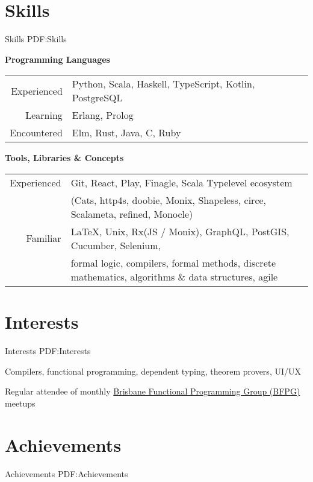 \documentclass[a4paper,10pt,oneside]{article}
\begin{document}
\begin{body}

\section
{Skills}
{Skills}
{PDF:Skills}

\textbf{Programming Languages}
\par
\begin{tabular}{rl}
\par Experienced & Python, Scala, Haskell, TypeScript, Kotlin, PostgreSQL\\
\par Learning & Erlang, Prolog\\
\par Encountered & Elm, Rust, Java, C, Ruby
\end{tabular}

\EntryGap
\EntryGap
\EntryGap

\textbf{Tools, Libraries \& Concepts}

\par
\begin{tabular}{rl}
\par Experienced & Git, React, Play, Finagle, Scala Typelevel ecosystem\\
						 & (Cats, http4s, doobie, Monix, Shapeless, circe, Scalameta, refined, Monocle)\\
\par Familiar & \LaTeX, Unix, Rx(JS / Monix), GraphQL, PostGIS, Cucumber, Selenium,\\
& formal logic, compilers, formal methods, discrete mathematics, algorithms \& data structures, agile\\ 
\end{tabular}

\section
{Interests}
{Interests}
{PDF:Interests}

\par Compilers, functional programming, dependent typing, theorem provers, UI/UX
\par Regular attendee of monthly \href{https://www.meetup.com/en-AU/Brisbane-Functional-Programming-Group/}{Brisbane Functional Programming Group (BFPG)} meetups


\section
{Achievements}
{Achievements}
{PDF:Achievements}


\end{body}
\end{document}

